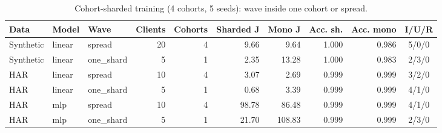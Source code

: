 \begin{table}[h]
\centering
\caption{Cohort-sharded training (4 cohorts, 5 seeds): wave inside one cohort or spread.}\label{tab:s_shard}
\footnotesize
\setlength{\tabcolsep}{3pt}
\begin{tabular}{@{}lllrrrrrrc@{}}
\toprule
Data & Model & Wave & Clients & Cohorts & Sharded J & Mono J & Acc. sh. & Acc. mono & I/U/R \\
\midrule
Synthetic & linear & spread & 20 & 4 & 9.66 & 9.64 & 1.000 & 0.986 & 5/0/0 \\
Synthetic & linear & one\_shard & 5 & 1 & 2.35 & 13.28 & 1.000 & 0.983 & 2/3/0 \\
HAR & linear & spread & 10 & 4 & 3.07 & 2.69 & 0.999 & 0.999 & 3/2/0 \\
HAR & linear & one\_shard & 5 & 1 & 0.68 & 3.39 & 0.999 & 0.999 & 4/1/0 \\
HAR & mlp & spread & 10 & 4 & 98.78 & 86.48 & 0.999 & 0.999 & 4/1/0 \\
HAR & mlp & one\_shard & 5 & 1 & 21.70 & 108.83 & 0.999 & 0.999 & 2/3/0 \\
\bottomrule
\end{tabular}
\end{table}

